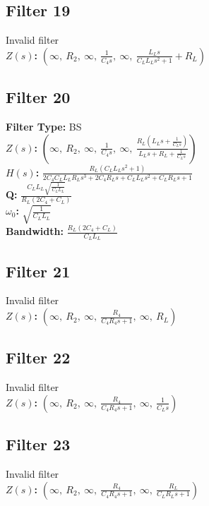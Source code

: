 \documentclass{article}
\begin{document}
\subsection*{Filter 19}
Invalid filter \\ 
\textbf{$Z(s)$:} $\left( \infty, \  R_{2}, \  \infty, \  \frac{1}{C_{4} s}, \  \infty, \  \frac{L_{L} s}{C_{L} L_{L} s^{2} + 1} + R_{L}\right)$ \\ 
\subsection*{Filter 20}
\textbf{Filter Type:} BS \\ 
\textbf{$Z(s)$:} $\left( \infty, \  R_{2}, \  \infty, \  \frac{1}{C_{4} s}, \  \infty, \  \frac{R_{L} \left(L_{L} s + \frac{1}{C_{L} s}\right)}{L_{L} s + R_{L} + \frac{1}{C_{L} s}}\right)$ \\ 
\textbf{$H(s)$:} $\frac{R_{L} \left(C_{L} L_{L} s^{2} + 1\right)}{2 C_{4} C_{L} L_{L} R_{L} s^{3} + 2 C_{4} R_{L} s + C_{L} L_{L} s^{2} + C_{L} R_{L} s + 1}$ \\ 
\textbf{Q:} $\frac{C_{L} L_{L} \sqrt{\frac{1}{C_{L} L_{L}}}}{R_{L} \left(2 C_{4} + C_{L}\right)}$ \\ 
\textbf{$\omega_0$:} $\sqrt{\frac{1}{C_{L} L_{L}}}$ \\ 
\textbf{Bandwidth:} $\frac{R_{L} \left(2 C_{4} + C_{L}\right)}{C_{L} L_{L}}$ \\ 
\subsection*{Filter 21}
Invalid filter \\ 
\textbf{$Z(s)$:} $\left( \infty, \  R_{2}, \  \infty, \  \frac{R_{4}}{C_{4} R_{4} s + 1}, \  \infty, \  R_{L}\right)$ \\ 
\subsection*{Filter 22}
Invalid filter \\ 
\textbf{$Z(s)$:} $\left( \infty, \  R_{2}, \  \infty, \  \frac{R_{4}}{C_{4} R_{4} s + 1}, \  \infty, \  \frac{1}{C_{L} s}\right)$ \\ 
\subsection*{Filter 23}
Invalid filter \\ 
\textbf{$Z(s)$:} $\left( \infty, \  R_{2}, \  \infty, \  \frac{R_{4}}{C_{4} R_{4} s + 1}, \  \infty, \  \frac{R_{L}}{C_{L} R_{L} s + 1}\right)$ \\ 
\end{document}
